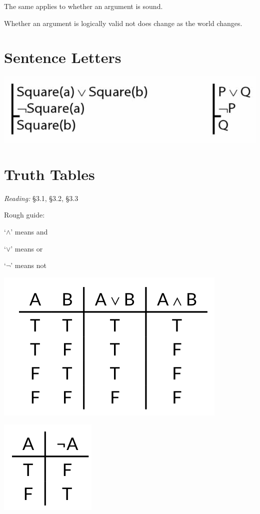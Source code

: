 \documentclass[12pt]{extarticle}
\begin{document}
\begin{multicols*}{3}
The same applies to whether an argument is sound.
 
Whether an argument is logically valid not does change as the world changes.
 
 
 
\section{Sentence Letters}
 
\begin{center}
\includegraphics[scale=0.3]{img/sentence_letters.png}
\end{center}
 
 
\section{Truth Tables}
 
\emph{Reading:} §3.1, §3.2, §3.3
 
Rough guide:
 
`$\land{}$' means and
 
`$\lor{}$' means or
 
`$\lnot{}$' means not
 
\begin{center}
\includegraphics[scale=0.3]{img/truth_table_or_and.png}
\end{center}
\begin{center}
\includegraphics[scale=0.3]{img/truth_table_not.png}
\end{center}
 

\end{multicols*}
\end{document}
